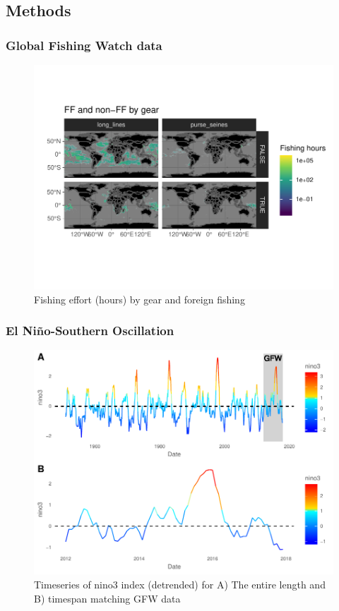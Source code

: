 \documentclass[11pt]{article}
\begin{document}
\subsection{Methods}

\subsubsection{Global Fishing Watch data}

\begin{figure}
\centering
\includegraphics{../img/fishing_raster.pdf}
\caption{Fishing effort (hours) by gear and foreign fishing}
\end{figure}


\subsubsection{El Ni\~{n}o-Southern Oscillation}

\begin{figure}
\centering
\includegraphics{../img/nino_gfw.pdf}
\caption{Timeseries of nino3 index (detrended) for A) The entire length
and B) timespan matching GFW data}
\end{figure}
\end{document}
